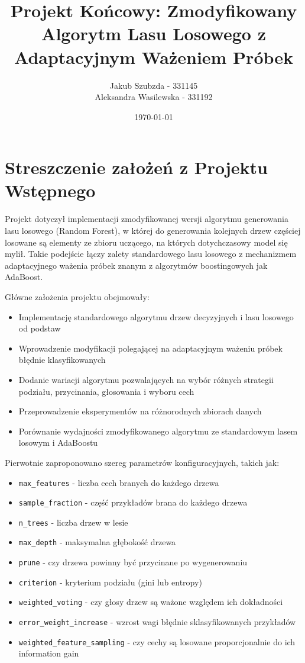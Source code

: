 \documentclass[11pt,a4paper]{article}
\title{Projekt Końcowy: Zmodyfikowany Algorytm Lasu Losowego z Adaptacyjnym Ważeniem Próbek}
\author{Jakub Szubzda - 331145 \\ Aleksandra Wasilewska - 331192}
\date{\today}
\begin{document}
\maketitle
\tableofcontents
\newpage

\section{Streszczenie założeń z Projektu Wstępnego}

Projekt dotyczył implementacji zmodyfikowanej wersji algorytmu generowania lasu losowego (Random Forest), w której do generowania kolejnych drzew częściej losowane są elementy ze zbioru uczącego, na których dotychczasowy model się mylił. Takie podejście łączy zalety standardowego lasu losowego z mechanizmem adaptacyjnego ważenia próbek znanym z algorytmów boostingowych jak AdaBoost.

Główne założenia projektu obejmowały:

\begin{itemize}
    \item Implementację standardowego algorytmu drzew decyzyjnych i lasu losowego od podstaw
    \item Wprowadzenie modyfikacji polegającej na adaptacyjnym ważeniu próbek błędnie klasyfikowanych
    \item Dodanie wariacji algorytmu pozwalających na wybór różnych strategii podziału, przycinania, głosowania i wyboru cech
    \item Przeprowadzenie eksperymentów na różnorodnych zbiorach danych
    \item Porównanie wydajności zmodyfikowanego algorytmu ze standardowym lasem losowym i AdaBoostu
\end{itemize}

Pierwotnie zaproponowano szereg parametrów konfiguracyjnych, takich jak:
\begin{itemize}
    \item \texttt{max\_features} - liczba cech branych do każdego drzewa
    \item \texttt{sample\_fraction} - część przykładów brana do każdego drzewa
    \item \texttt{n\_trees} - liczba drzew w lesie
    \item \texttt{max\_depth} - maksymalna głębokość drzewa
    \item \texttt{prune} - czy drzewa powinny być przycinane po wygenerowaniu
    \item \texttt{criterion} - kryterium podziału (gini lub entropy)
    \item \texttt{weighted\_voting} - czy głosy drzew są ważone względem ich dokładności
    \item \texttt{error\_weight\_increase} - wzrost wagi błędnie sklasyfikowanych przykładów
    \item \texttt{weighted\_feature\_sampling} - czy cechy są losowane proporcjonalnie do ich information gain
\end{itemize}
\end{document}
